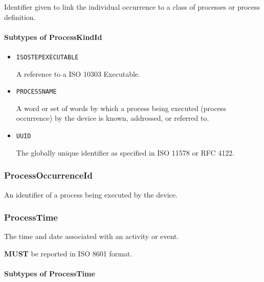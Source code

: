 Identifier given to link the individual occurrence to a class of processes or process definition.



\paragraph{Subtypes of ProcessKindId}\mbox{}
\label{sec:Subtypes of ProcessKindId}

\begin{itemize}

\item \texttt{ISO\textunderscore STEP\textunderscore EXECUTABLE}


A reference to a ISO 10303 Executable.

\item \texttt{PROCESS\textunderscore NAME}


A word or set of words by which a process being executed (process occurrence) by the device is known, addressed, or referred to.


\item \texttt{UUID}


The globally unique identifier as specified in ISO 11578 or RFC 4122.


\end{itemize}






\subsubsection{ProcessOccurrenceId}
\label{sec:ProcessOccurrenceId}



An identifier of a process being executed by the device.



\subsubsection{ProcessTime}
\label{sec:ProcessTime}



The time and date associated with an activity or event.
  
 \textbf{MUST} be reported in ISO 8601 format.


\paragraph{Subtypes of ProcessTime}\mbox{}
\label{sec:Subtypes of ProcessTime}

